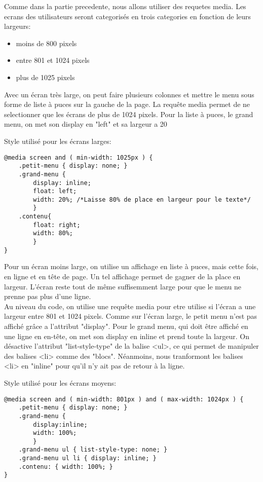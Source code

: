 Comme dans la partie precedente, nous allons utiliser des requetes media. Les ecrans des utilisateurs seront categorisés en trois categories en fonction de leurs largeurs:
\begin{itemize}
\item moins de 800 pixels
\item entre 801 et 1024 pixels
\item plus de 1025 pixels
\end{itemize}

Avec un écran très large, on peut faire plusieurs colonnes et mettre le menu sous forme de liste à puces  sur la gauche de la page.  La requête media permet de ne selectionner que les écrans de plus de 1024 pixels. Pour la liste à puces, le grand menu, on met son display en "left" et sa largeur a 20%

Style utilisé pour les écrans larges:
\begin{verbatim}
@media screen and ( min-width: 1025px ) {
	.petit-menu { display: none; }
	.grand-menu {
		display: inline;
		float: left;
		width: 20%; /*Laisse 80% de place en largeur pour le texte*/
		}
	.contenu{
		float: right;
		width: 80%;
		}
}
\end{verbatim}

Pour un écran moins large, on utilise un affichage en liste à puces, mais cette fois, en ligne et en tête de page. Un tel affichage permet de gagner de la place en largeur. L'écran reste tout de même suffisemment large pour que le menu ne prenne pas plus d'une ligne.\\
Au niveau du code, on utilise une requête media pour etre utilise si l'écran a une largeur entre 801 et 1024 pixels. Comme sur l'écran large, le petit menu n'est pas affiché grâce a l'attribut "display". Pour le grand menu, qui doit être affiché en une ligne en en-tête, on met son display en inline et prend toute la largeur. On désactive l'attribut "list-style-type" de la balise <ul>, ce qui permet de manipuler des balises <li> comme des "blocs". Néanmoins, nous tranformont les balises <li> en "inline" pour qu'il n'y ait pas de retour à la ligne.

Style utilisé pour les écrans moyens:
\begin{verbatim}
@media screen and ( min-width: 801px ) and ( max-width: 1024px ) {
	.petit-menu { display: none; }
	.grand-menu {
		display:inline;
		width: 100%;
		}
	.grand-menu ul { list-style-type: none; }
	.grand-menu ul li { display: inline; }
	.contenu: { width: 100%; }
}
\end{verbatim}

